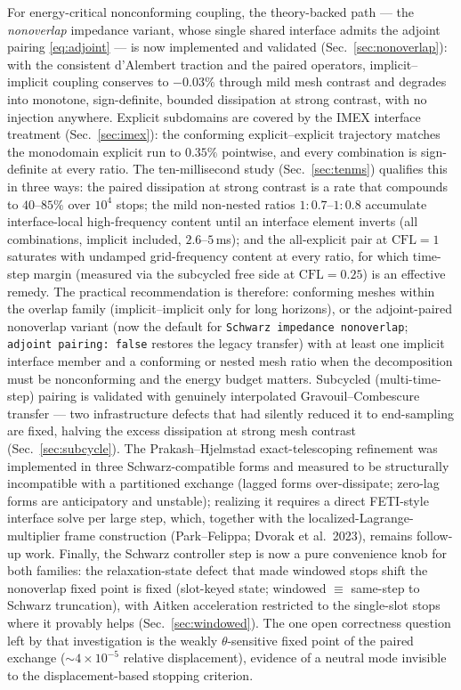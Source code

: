 \documentclass[11pt]{article}
\newcommand{\code}[1]{\texttt{#1}}
\begin{document}
For energy-critical nonconforming coupling, the theory-backed path --- the
\emph{nonoverlap} impedance variant, whose single shared interface admits the
adjoint pairing \eqref{eq:adjoint} --- is now implemented and validated
(Sec.~\ref{sec:nonoverlap}): with the consistent d'Alembert traction and the
paired operators, implicit--implicit coupling conserves to $-0.03\%$ through
mild mesh contrast and degrades into monotone, sign-definite, bounded
dissipation at strong contrast, with no injection anywhere. Explicit
subdomains are covered by the IMEX interface treatment
(Sec.~\ref{sec:imex}): the conforming explicit--explicit trajectory matches
the monodomain explicit run to $0.35\%$ pointwise, and every combination is
sign-definite at every ratio. The ten-millisecond study
(Sec.~\ref{sec:tenms}) qualifies this in three ways: the paired
dissipation at strong contrast is a rate that compounds to $40$--$85\%$
over $10^4$ stops; the mild non-nested ratios $1{:}0.7$--$1{:}0.8$
accumulate interface-local high-frequency content until an interface
element inverts (all combinations, implicit included, $2.6$--$5$\,ms);
and the all-explicit pair at $\mathrm{CFL}=1$ saturates with undamped
grid-frequency content at every ratio, for which time-step margin
(measured via the subcycled free side at $\mathrm{CFL}=0.25$) is an
effective remedy. The practical recommendation is therefore:
conforming meshes within the overlap family (implicit--implicit only for
long horizons), or the adjoint-paired
nonoverlap variant (now the default for \code{Schwarz impedance nonoverlap}; \code{adjoint pairing: false} restores the legacy transfer) with at least
one implicit interface member and a conforming or nested mesh ratio when
the decomposition
must be nonconforming and the energy budget matters. Subcycled
(multi-time-step) pairing is validated with genuinely interpolated
Gravouil--Combescure transfer --- two infrastructure defects that had
silently reduced it to end-sampling are fixed, halving the excess
dissipation at strong mesh contrast (Sec.~\ref{sec:subcycle}). The
Prakash--Hjelmstad exact-telescoping refinement was implemented in three
Schwarz-compatible forms and measured to be structurally incompatible with
a partitioned exchange (lagged forms over-dissipate; zero-lag forms are
anticipatory and unstable); realizing it requires a direct FETI-style
interface solve per large step, which, together with the
localized-Lagrange-multiplier frame construction (Park--Felippa; Dvorak et
al.\ 2023), remains follow-up work. Finally, the Schwarz controller step is
now a pure convenience knob for both families: the relaxation-state defect
that made windowed stops shift the nonoverlap fixed point is fixed
(slot-keyed state; windowed $\equiv$ same-step to Schwarz truncation), with
Aitken acceleration restricted to the single-slot stops where it provably
helps (Sec.~\ref{sec:windowed}). The one open correctness question left by
that investigation is the weakly $\theta$-sensitive fixed point of the
paired exchange (${\sim}4\times 10^{-5}$ relative displacement), evidence
of a neutral mode invisible to the displacement-based stopping criterion.
\end{document}
